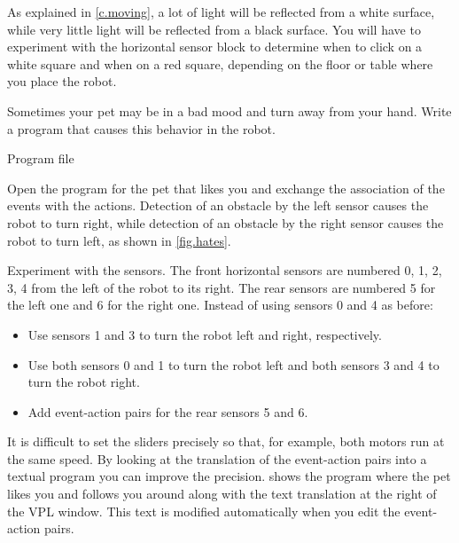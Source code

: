 As explained in \cref{c.moving}, a lot of light will be reflected
from a white surface, while very little light will be reflected from a
black surface.
You will have to experiment with the horizontal sensor block to determine when to click on a white square and when on a red square, depending on the floor or table where you place the robot.





Sometimes your pet may be in a bad mood and turn away from your hand.
Write a program that causes this behavior in the robot.

{\raggedleft \hfill Program file }

Open the program for the pet that likes you and exchange the association
of the events with the actions. Detection of an obstacle by the left
sensor causes the robot to turn right, while detection of an obstacle by
the right sensor causes the robot to turn left, as shown in \cref{fig.hates}.


{
Experiment with the sensors.
The front horizontal sensors are numbered 0, 1, 2, 3, 4 from the left of the robot to its right.
The rear sensors are numbered 5 for the left one and 6 for the right one.
Instead of using sensors 0 and 4 as before:
\begin{itemize}[noitemsep,nosep,leftmargin=*]
\item Use sensors 1 and 3 to turn the robot left and right,
respectively.
\item Use both sensors 0 and 1 to turn the robot left and both sensors 3
and 4 to turn the robot right.
\item Add event-action pairs for the rear sensors 5 and 6.
\end{itemize}
}


It is difficult to set the sliders precisely so that, for example, both
motors run at the same speed. By looking at the translation of the
event-action pairs into a textual program you can improve the precision.
 shows the program where the pet likes you and follows you around along with the text translation at the right of the VPL window.
This text is modified automatically when you edit the event-action pairs.

